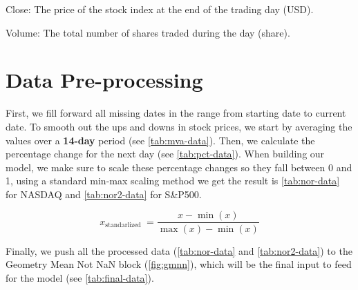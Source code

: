 Close: The price of the stock index at the end of the trading day (USD).

Volume: The total number of shares traded during the day (share).

\section{Data Pre-processing}
First, we fill forward all missing dates in the range from starting date to current
date. To smooth out the ups and downs in stock prices, we start by averaging the
values over a \textbf{14-day} period (see \autoref{tab:mva-data}). Then, we
calculate the percentage change for the next day (see \autoref{tab:pct-data}). When
building our model, we make sure to scale these percentage changes so they fall
between 0 and 1, using a standard min-max scaling method we get the result is \autoref{tab:nor-data}
for NASDAQ and \autoref{tab:nor2-data} for S\&P500.

\begin{equation}
	x_{\text{standarlized }}=\frac{x-\min (x)}{\max (x)-\min (x)}\label{normalized}
\end{equation}

Finally, we push all the processed data (\autoref{tab:nor-data} and
\autoref{tab:nor2-data}) to the Geometry Mean Not NaN block (\autoref{fig:gmnn}),
which will be the final input to feed for the model (see \autoref{tab:final-data}).

